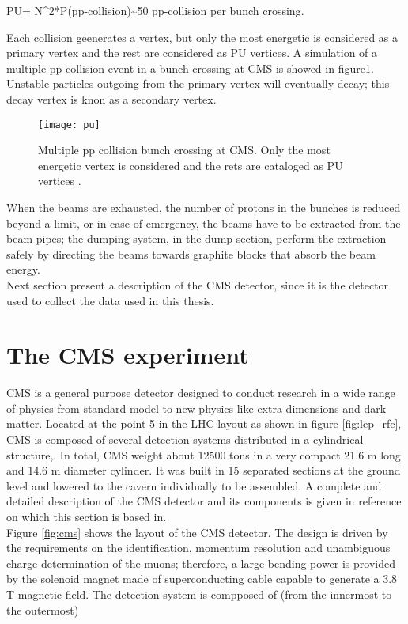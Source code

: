 \beqn
PU= N^2*P(pp-collision)\sim 50  \textrm{  pp-collision per bunch crossing}.
\eeqn

\noindent Each collision geenerates a vertex, but only the most energetic is considered as a primary vertex and the rest are considered as PU vertices. A simulation of a multiple pp collision event in a bunch crossing at CMS is showed in figure\ref{fig:pu}. Unstable particles outgoing from the primary vertex will eventually decay; this decay vertex is knon as a secondary vertex.      

\begin{figure}[!h]
\centering
\texttt{[image: pu]}
\caption [Multiple pp collision bunch crossing at CMS.]{Multiple pp collision bunch crossing at CMS. Only the most energetic vertex is considered and the rets are cataloged as PU vertices \cite{}. }\label{fig:pu}
\end{figure}

\noindent When the beams are exhausted, \ie the number of protons in the bunches is reduced beyond a limit, or in case of emergency, the beams have to be extracted from the beam pipes; the dumping system, in the dump section, perform the extraction safely by directing the beams towards graphite blocks that absorb the beam energy.\\

\noindent Next section present a description of the CMS detector, since it is the detector used to collect the data used in this thesis.


\section{The CMS experiment}

\noindent CMS is a general purpose detector designed to conduct research in a wide range of physics from standard model to new physics like extra dimensions and dark matter. Located at the point 5 in the LHC layout as shown in figure \ref{fig:lep_rfc}, CMS is composed of several detection systems distributed in a cylindrical structure,. In total, CMS weight about 12500 tons in a very compact 21.6 m long and 14.6 m diameter cylinder. It was built in 15 separated sections at the ground level and lowered to the cavern individually to be assembled. A complete and detailed description of the CMS detector and its components is given in reference \cite{cms} on which this section is based in.\\

\noindent Figure \ref{fig:cms} shows the layout of the CMS detector. The design is driven by the requirements on the identification, momentum resolution and unambiguous charge determination of the muons; therefore, a large bending power is provided by the solenoid magnet made of superconducting cable capable to generate a 3.8 T magnetic field. The detection system is compposed of (from the innermost to the outermost)

